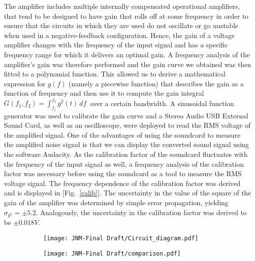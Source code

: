 \begin{linenumbers}
The amplifier includes  multiple internally compensated operational amplifiers, that tend to be designed to have gain that rolls off at some frequency in order to ensure that the circuits in which they are used do not oscillate or go unstable when used in a negative-feedback configuration. Hence, the gain of a voltage amplifier changes with the frequency of the input signal and has a specific frequency range for which it delivers an optimal gain\cite{6908352}. A frequency analysis of the amplifier’s gain was therefore performed and the gain curve we obtained was then fitted to a polynomial function. This allowed us to derive a mathematical expression for $g(f)$ (namely a piecewise function) that describes the gain as a function of frequency and then use it to compute the gain integral $G(f_1, f_2)= \int_{f_1}^{f_2} g^2(t)\,df\ $ over a certain bandwidth. A sinusoidal function generator was used to calibrate the gain curve and a Stereo Audio USB External Sound Card, as well as an oscilloscope, were deployed to read the RMS voltage of the amplified signal. One of the advantages of using the soundcard to measure the amplified noise signal is that we can display the converted sound signal using the software Audacity. As the calibration factor of the soundcard fluctuates with the frequency of the input signal as well, a frequency analysis of the calibration factor was necessary before using the soundcard as a tool to measure the RMS voltage signal. The frequency dependence of the calibration factor was derived and is displayed in [Fig.~\ref{calib}]. The uncertainty in the value of the square of the gain of the amplifier was determined by simple error propagation, yielding $\sigma_{g^2}=\pm5.2$. Analogously, the uncertainty in the calibration factor was derived to be $\pm 0.018V$. 


\begin{figure}
\centering
\begin{subfigure}[a]{0.55\textwidth}
   \texttt{[image: JNM-Final Draft/Circuit\_diagram.pdf]}
   \label{fig:circuit} 
\end{subfigure}

\begin{subfigure}[b]{0.55\textwidth}
   \texttt{[image: JNM-Final Draft/comparison.pdf]}
   \caption{}
   \label{fig:powerspectra}
\end{subfigure}


\end{figure}
\end{linenumbers}
